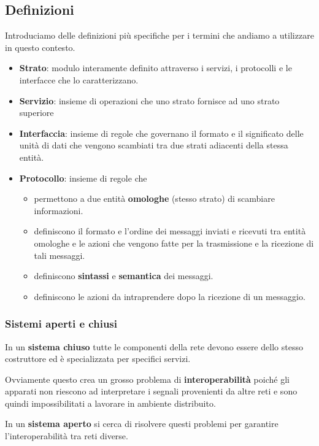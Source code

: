 \subsection{Definizioni}
Introduciamo delle definizioni più specifiche per i termini che andiamo
a utilizzare in questo contesto.
\begin{itemize}
	\item \textbf{Strato}: modulo interamente definito attraverso i 
		servizi, i protocolli e le interfacce che lo caratterizzano.
	\item \textbf{Servizio}: insieme di operazioni che uno strato 
		fornisce ad uno strato superiore
	\item \textbf{Interfaccia}: insieme di regole che governano il
		formato e il significato delle unità di dati che vengono
		scambiati tra due strati adiacenti della stessa entità.
	\item \textbf{Protocollo}: insieme di regole che
		\begin{itemize}
			\item permettono a due entità \textbf{omologhe} (stesso 
				strato) di scambiare informazioni.
			\item definiscono il formato e l'ordine dei messaggi 
				inviati e ricevuti tra entità omologhe e le azioni che
				vengono fatte per la trasmissione e la ricezione di 
				tali messaggi.
			\item definiscono \textbf{sintassi} e \textbf{semantica} 
				dei messaggi.
			\item definiscono le azioni da intraprendere dopo la 
				ricezione di un messaggio.
		\end{itemize}
\end{itemize}

\subsubsection{Sistemi aperti e chiusi}
In un \textbf{sistema chiuso} tutte le componenti della rete devono 
essere dello stesso costruttore ed è specializzata per specifici 
servizi.

Ovviamente questo crea un grosso problema di \textbf{interoperabilità} 
poiché gli apparati non riescono ad interpretare i segnali 
provenienti da altre reti e sono quindi impossibilitati a lavorare in 
ambiente distribuito.

In un \textbf{sistema aperto} si cerca di risolvere questi problemi 
per garantire l'interoperabilità tra reti diverse.

